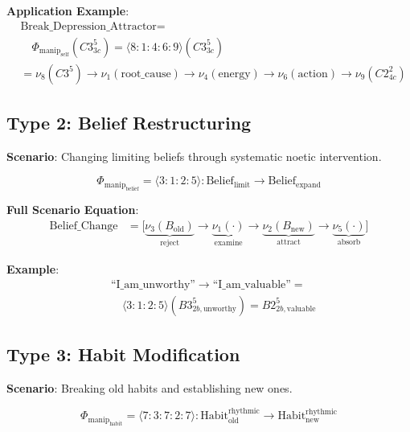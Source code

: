 \documentclass[11pt,twoside]{book}
\newcommand{\noe}[1]{\nu_{#1}}
\newcommand{\ManipFrac}{\Phi_{\mathrm{manip}}}
\begin{document}
\textbf{Application Example}:
\begin{align}
    &\text{Break\_Depression\_Attractor} = \nonumber \\
    &\quad \ManipFrac_{\mathrm{self}}(C3^5_{3c}) = \langle 8:1:4:6:9 \rangle(C3^5_{3c}) \\
    &= \noe{8}(C3^5) \to \noe{1}(\text{root\_cause}) \to \noe{4}(\text{energy})
    \to \noe{6}(\text{action}) \to \noe{9}(C2^2_{4c}) \nonumber
\end{align}

\subsection{Type 2: Belief Restructuring}

\textbf{Scenario}: Changing limiting beliefs through systematic noetic intervention.

\begin{equation}
\boxed{
    \ManipFrac_{\mathrm{belief}} = \langle 3 : 1 : 2 : 5 \rangle
    : \mathrm{Belief}_{\mathrm{limit}} \to \mathrm{Belief}_{\mathrm{expand}}
}
\end{equation}

\textbf{Full Scenario Equation}:
\begin{align}
    \text{Belief\_Change} &= \biggl[
    \underbrace{\noe{3}(B_{\mathrm{old}})}_{\scriptscriptstyle\text{reject}}
    \to \underbrace{\noe{1}(\cdot)}_{\scriptscriptstyle\text{examine}}
    \to \underbrace{\noe{2}(B_{\mathrm{new}})}_{\scriptscriptstyle\text{attract}}
    \to \underbrace{\noe{5}(\cdot)}_{\scriptscriptstyle\text{absorb}}
    \biggr]
\end{align}

\textbf{Example}:
\begin{align}
    &\text{``I\_am\_unworthy''} \to \text{``I\_am\_valuable''} = \nonumber \\
    &\quad \langle 3:1:2:5 \rangle(B3^5_{2b,\text{unworthy}})
    = B2^5_{2b,\text{valuable}}
\end{align}

\subsection{Type 3: Habit Modification}

\textbf{Scenario}: Breaking old habits and establishing new ones.

\begin{equation}
\boxed{
    \ManipFrac_{\mathrm{habit}} = \langle 7 : 3 : 7 : 2 : 7 \rangle
    : \mathrm{Habit}_{\mathrm{old}}^{\mathrm{rhythmic}} \to
    \mathrm{Habit}_{\mathrm{new}}^{\mathrm{rhythmic}}
}
\end{equation}
\end{document}
